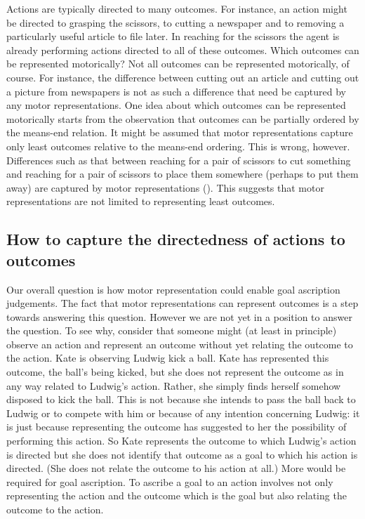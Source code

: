 \documentclass[12pt,\papersize]{extarticle}
\begin{document}
Actions are typically directed to many outcomes.  For instance, an action might be directed to grasping the scissors, to cutting a newspaper and to removing a particularly useful article to file later.  In reaching for the scissors the agent is already performing actions directed to all of these outcomes.  Which outcomes can be represented motorically?  Not all outcomes can be represented motorically, of course.  For instance, the difference between cutting out an article and cutting out a picture from newspapers is not as such a difference that need be captured by any motor representations.  One idea about which outcomes can be represented motorically starts from the observation that outcomes can be partially ordered by the means-end relation. It might be assumed that motor representations capture only least outcomes relative to the means-end ordering.  This is wrong, however.  Differences such as that between reaching for a pair of scissors to cut something and reaching for a pair of scissors to place them somewhere (perhaps to put them away) are captured by motor representations (\citealp{Fogassi:2005nf, cattaneo:2007_impairment, bonini:2010_ventral}). This suggests that motor representations are not limited to representing least outcomes.  



\subsection{How to capture the directedness of actions to outcomes}
Our overall question is how motor representation could enable goal ascription judgements. The fact that motor representations can represent outcomes is a step towards answering this question. However we are not yet in a position to answer the question. To see why, consider that someone might (at least in principle) observe an action and represent an outcome without yet relating the outcome to the action. Kate is observing Ludwig kick a ball. Kate has represented this outcome, the ball's being kicked, but she does not represent the outcome as in any way related to Ludwig's action. Rather, she simply finds herself somehow disposed to kick the ball. This is not because she intends to pass the ball back to Ludwig or to compete with him or because of any intention concerning Ludwig: it is just because representing the outcome has suggested to her the possibility of performing this action. So Kate represents the outcome to which Ludwig's action is directed but she does not identify that outcome as a goal to which his action is directed. (She does not relate the outcome to his action at all.)  More would be required for goal ascription. To ascribe a goal to an action involves not only representing the action and the outcome which is the goal but also relating the outcome to the action.
\end{document}
